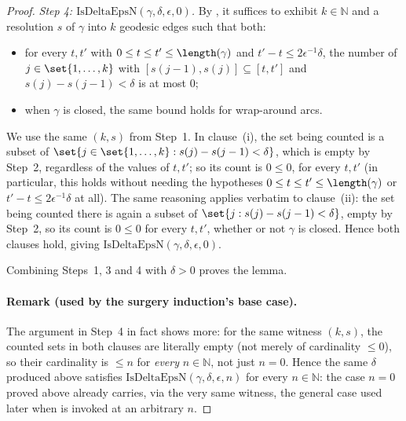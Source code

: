 \begin{proof}
  \emph{Step 4: $\mathrm{IsDeltaEpsN}(\gamma,\delta,\epsilon,0)$.} By , it
  suffices to exhibit $k \in \mathbb{N}$ and a resolution $s$ of $\gamma$ into $k$ geodesic edges
  such that both:
  \begin{itemize}
    \item[(i)] for every $t,t'$ with $0 \le t \le t' \le \length(\gamma)$ and $t'-t \le
      2\epsilon^{-1}\delta$, the number of $j \in \set{1,\dots,k}$ with $[s(j-1),s(j)] \subseteq
      [t,t']$ and $s(j)-s(j-1) < \delta$ is at most $0$;
    \item[(ii)] when $\gamma$ is closed, the same bound holds for wrap-around arcs.
  \end{itemize}
  We use the same $(k,s)$ from Step~1. In clause~(i), the set being counted is a subset of $\set{j
  \in \set{1,\dots,k} : s(j)-s(j-1)<\delta}$, which is empty by Step~2, regardless of the values of
  $t,t'$; so its count is $0 \le 0$, for every $t,t'$ (in particular, this holds without needing the
  hypotheses $0\le t\le t'\le\length(\gamma)$ or $t'-t\le 2\epsilon^{-1}\delta$ at all). The same
  reasoning applies verbatim to clause~(ii): the set being counted there is again a subset of $\set{j
  : s(j)-s(j-1)<\delta}$, empty by Step~2, so its count is $0\le 0$ for every $t,t'$, whether or not
  $\gamma$ is closed. Hence both clauses hold, giving $\mathrm{IsDeltaEpsN}(\gamma,\delta,\epsilon,0)$.

  Combining Steps~1, 3 and 4 with $\delta > 0$ proves the lemma.

  \paragraph{Remark (used by the surgery induction's base case).} The argument in Step~4 in fact
  shows more: for the same witness $(k,s)$, the counted sets in both clauses are literally empty
  (not merely of cardinality $\le 0$), so their cardinality is $\le n$ for \emph{every} $n \in
  \mathbb{N}$, not just $n=0$. Hence the same $\delta$ produced above satisfies
  $\mathrm{IsDeltaEpsN}(\gamma,\delta,\epsilon,n)$ for every $n \in \mathbb{N}$: the case $n=0$
  proved above already carries, via the very same witness, the general case used later when
   is invoked at an arbitrary $n$.
\end{proof}
